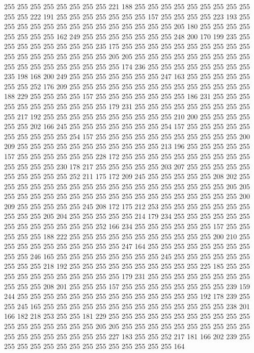 255 255 255 255 255 255 255 255 221 188 255 255 255 255 255 255 255 255 255 255
255 222 191 255 255 255 255 255 255 255 157 255 255 255 255 223 193 255 255 255
255 255 255 255 255 255 255 255 255 255 255 205 180 255 255 255 255 255 255 255
255 162 249 255 255 255 255 255 255 255 248 200 170 199 235 255 255 255 255 255
255 255 255 235 175 255 255 255 255 255 255 255 255 255 255 255 255 255 255 255
255 255 255 205 205 255 255 255 255 255 255 255 255 255 255 255 255 255 255 255
255 255 255 174 236 255 255 255 255 255 255 255 255 235 198 168 200 249 255 255
255 255 255 255 255 247 163 255 255 255 255 255 255 255 252 176 209 255 255 255
255 255 255 255 255 255 255 255 255 255 255 188 229 255 255 255 255 157 255 255
255 255 255 255 255 186 231 255 255 255 255 255 255 255 255 255 255 255 179 231
255 255 255 255 255 255 255 255 255 255 217 192 255 255 255 255 255 255 255 255
255 255 210 200 255 255 255 255 255 255 202 166 245 255 255 255 255 255 255 255
254 157 255 255 255 255 255 255 255 255 255 255 254 157 255 255 255 255 255 255
255 255 255 255 255 200 209 255 255 255 255 255 255 255 255 255 255 255 213 196
255 255 255 255 255 157 255 255 255 255 255 255 228 172 255 255 255 255 255 255
255 255 255 255 255 255 255 255 230 178 217 255 255 255 255 255 203 207 255 255
255 255 255 255 255 255 255 255 252 211 175 172 209 245 255 255 255 255 255 208
202 255 255 255 255 255 255 255 255 255 255 255 255 255 255 255 255 255 255 205
205 255 255 255 255 255 255 255 255 255 255 255 255 255 255 255 255 255 255 200
209 255 255 255 255 255 245 208 172 175 212 253 255 255 255 255 255 255 255 255
255 255 205 204 255 255 255 255 255 214 179 234 255 255 255 255 255 255 255 255
255 255 255 255 255 252 166 234 255 255 255 255 255 255 157 255 255 255 255 255
188 222 255 255 255 255 255 255 255 255 255 255 255 200 210 255 255 255 255 255
255 255 255 255 255 247 164 255 255 255 255 255 255 255 255 255 255 246 165 255
255 255 255 255 255 255 255 245 255 255 255 255 255 255 255 255 255 218 192 255
255 255 255 255 255 255 255 255 255 225 185 255 255 255 255 255 255 255 255 255
255 255 179 231 255 255 255 255 255 255 255 255 255 255 255 208 201 255 255 255
157 255 255 255 255 255 255 255 255 239 159 244 255 255 255 255 255 255 255 255
255 255 255 255 255 255 192 178 239 255 255 245 165 255 255 255 255 255 255 255
255 255 255 255 255 255 255 238 201 166 182 218 253 255 255 181 229 255 255 255
255 255 255 255 255 255 255 255 255 255 255 255 255 255 255 205 205 255 255 255
255 255 255 255 255 255 255 255 255 255 255 255 255 255 255 227 183 255 255 252
217 181 166 202 239 255 255 255 255 255 255 255 255 255 255 255 255 255 255 164

